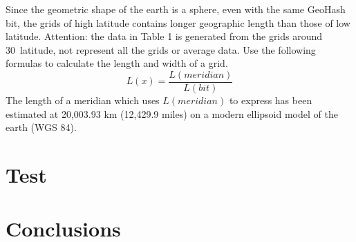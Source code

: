 \documentclass[sigplan,screen]{acmart}
\begin{document}
Since the geometric shape of the earth is a sphere, even with the same GeoHash bit, the grids of high latitude contains longer geographic length than those of low latitude.
Attention: the data in Table 1 is generated from the grids around 30\degree\ latitude, not represent all the grids or average data.
Use the following formulas to calculate the length and width of a grid.
\begin{equation}
    L(x)=\frac{L(meridian)}{L(bit)}
\end{equation}
The length of a meridian which uses $L(meridian)$ to express has been estimated at 20,003.93 km (12,429.9 miles) on a modern ellipsoid model of the earth (WGS 84)\cite{weintrit2013so}.
\section{Test}
\section{Conclusions}


\end{document}
